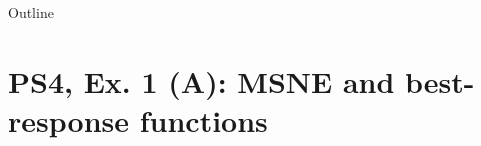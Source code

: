 

\maketitle

\begin{frame}{Outline}
    \tableofcontents
\end{frame}


\section{PS4, Ex. 1 (A): MSNE and best-response functions}

